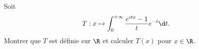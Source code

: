 \begin{enonce}
\begin{exercise}[ID={RMS130 E733},subtitle={Mines-Ponts PSI 2019},tags={}]
Soit
\begin{equation*}
  T: x\mapsto \int_0^{+\infty} \frac{e^{itx} - 1}{t} e^{-t} \d t.
\end{equation*}
  Montrer que $T$ est définie sur $\R$ et calculer $T(x)$ pour $x\in\R$.
\end{exercise}
\begin{solution}
\end{solution}
\end{enonce}
